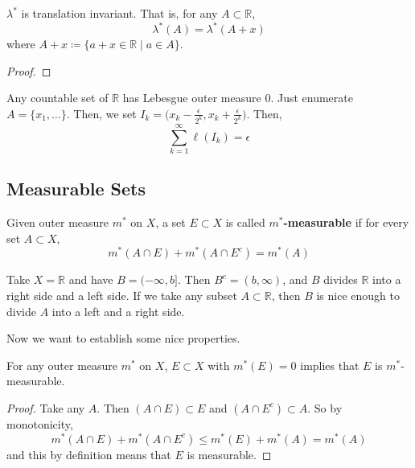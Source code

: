   \begin{theorem}
    $\lambda^\ast$ is translation invariant. That is, for any $A \subset \mathbb{R}$, 
    \begin{equation}
      \lambda^\ast (A) = \lambda^\ast (A + x)
    \end{equation}
    where $A + x \coloneqq \{a + x \in \mathbb{R} \mid a \in A \}$. 
  \end{theorem}
  \begin{proof}
    
  \end{proof}

  \begin{example}
    Any countable set of $\mathbb{R}$ has Lebesgue outer measure $0$. Just enumerate $A = \{x_1, \ldots \}$. Then, we set $I_k = \big( x_k - \frac{\epsilon}{2^k}, x_k + \frac{\epsilon}{2^k} \big)$. Then, 
    \begin{equation}
      \sum_{k=1}^\infty \ell(I_k) = \epsilon
    \end{equation}
  \end{example}

\subsection{Measurable Sets}

  \begin{definition}
    Given outer measure $m^\ast$ on $X$, a set $E \subset X$  is called \textbf{$m^\ast$-measurable} if for every set $A \subset X$, 
    \begin{equation}
      m^\ast (A \cap E) + m^\ast (A \cap E^c) = m^\ast (A) 
    \end{equation}
  \end{definition} 

  \begin{example}
    Take $X = \mathbb{R}$ and have $B = (-\infty, b]$. Then $B^c = (b, \infty)$, and $B$ divides $\mathbb{R}$ into a right side and a left side. If we take any subset $A \subset \mathbb{R}$, then $B$ is nice enough to divide $A$ into a left and a right side. 
  \end{example} 

  Now we want to establish some nice properties. 

  \begin{lemma}
    For any outer measure $m^\ast$ on $X$, $E \subset X$ with $m^\ast (E) = 0$  implies that $E$ is $m^\ast$-measurable. 
  \end{lemma}
  \begin{proof}
    Take any $A$. Then $(A \cap E) \subset E$ and $(A \cap E^c) \subset A$. So by monotonicity, 
    \begin{equation}
      m^\ast(A \cap E) + m^\ast (A \cap E^c) \leq m^\ast(E) + m^\ast(A) = m^\ast (A)
    \end{equation}
    and this by definition means that $E$ is measurable. 
  \end{proof}

